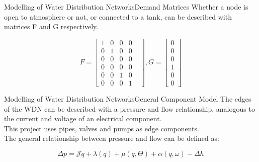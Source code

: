 \begin{frame}{Modelling of Water Distribution Networks}{Demand Matrices}
Whether a node is open to atmosphere or not, or connected to a tank, can be described with matrices F and G respectively.
	
	
\begin{equation}
	F = \begin{bmatrix}
		1 & 0 & 0 & 0 \\
		0 & 1 & 0 & 0 \\
		0 & 0 & 0 & 0 \\
		0 & 0 & 0 & 0 \\
		0 & 0 & 1 & 0 & \\
		0 & 0 & 0 & 1 &
	\end{bmatrix}
	 , G = \begin{bmatrix}
		0  \\
		0  \\
		0  \\
		1  \\
		0 \\
		0 
\end{bmatrix}
\end{equation} 


	
\end{frame}



\begin{frame}{Modelling of Water Distribution Networks}{General Component Model}
	The edges of the WDN can be described with a pressure and flow relationship, analogous to the current and voltage of an electrical component. \\
	\medskip
	This project uses pipes, valves and pumps as edge components. \\
	\medskip
	The general relationship between pressure and flow can be defined as:
	
	\begin{equation}\label{eq:PressureFunction}
		\Delta p = \mathcal{J}\dot{q} + \lambda(q) + \mu(q, \Theta) + \alpha(q, \omega) -\Delta h
	\end{equation}
	
	
\end{frame}




